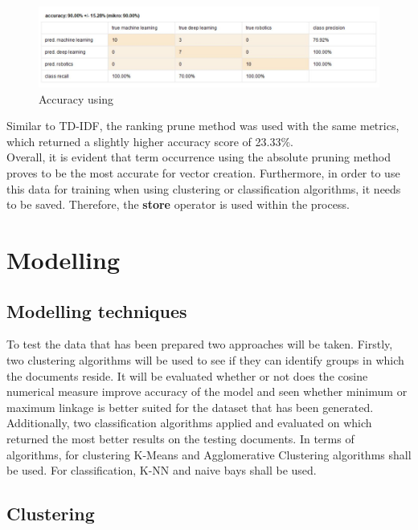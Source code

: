 \begin{figure}[ht]
	\begin{center}
		\advance\leftskip-3cm
		\advance\rightskip-3cm
		\includegraphics[keepaspectratio=true,scale=0.6]{__resources/to.JPG}
		\caption{Accuracy using }
		\label{stop}
	\end{center}
\end{figure} 

Similar to TD-IDF, the ranking prune method was used with the same metrics, which returned a slightly higher accuracy score of 23.33\%.\\
Overall, it is evident that term occurrence using the absolute pruning method proves to be the most accurate for vector creation. Furthermore, in order to use this data for training when using clustering or classification algorithms, it needs to be saved. Therefore, the \textbf{store} operator is used within the process.




\section*{Modelling}

\subsection*{Modelling techniques}
To test the data that has been prepared two approaches will be taken. Firstly, two clustering algorithms will be used to see if they can identify groups in which the documents reside. It will be evaluated whether or not does the cosine numerical measure improve accuracy of the model and seen whether minimum or maximum linkage is better suited for the dataset that has been generated. Additionally, two classification algorithms applied and evaluated on which returned the most better results on the testing documents.
In terms of algorithms, for clustering K-Means and Agglomerative Clustering algorithms shall be used. For classification, K-NN and naive bays shall be used. 
\subsection*{Clustering}

